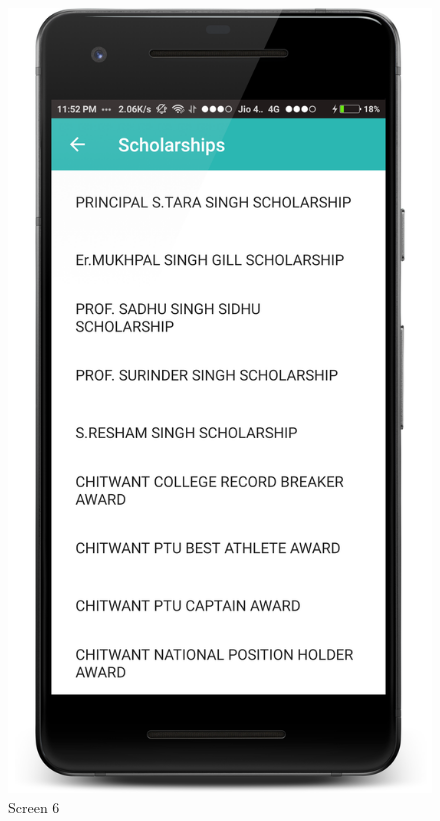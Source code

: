 \begin{figure}[ht]
\centering
\includegraphics[scale=0.13]{images/S6.png}
\caption{Screen 6}
\end{figure}

\newpage

